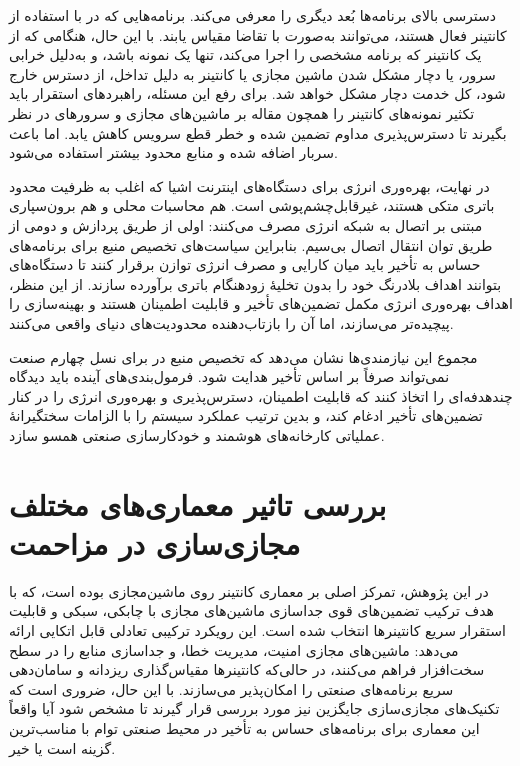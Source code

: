 دسترسی بالای برنامه‌ها بُعد دیگری را معرفی می‌کند. برنامه‌هایی که در  با استفاده از کانتینر فعال هستند، می‌توانند به‌صورت با تقاضا مقیاس یابند. با این حال، هنگامی که از یک کانتینر که برنامه مشخصی را اجرا می‌کند، تنها یک نمونه باشد، و به‌دلیل خرابی سرور، یا دچار مشکل شدن ماشین مجازی یا کانتینر به دلیل تداخل، از دسترس خارج شود، کل خدمت دچار مشکل خواهد شد. برای رفع این مسئله، راهبردهای استقرار باید تکثیر نمونه‌های کانتینر را همچون مقاله \cite{Zhang2020Neighbors} بر ماشین‌های مجازی و سرور‌های در نظر بگیرند تا دسترس‌پذیری مداوم تضمین شده و خطر قطع سرویس کاهش یابد. اما باعث سربار اضافه شده و منابع محدود  بیشتر استفاده می‌شود.

در نهایت، بهره‌وری انرژی برای دستگاه‌های اینترنت اشیا که اغلب به ظرفیت محدود باتری متکی هستند، غیرقابل‌چشم‌پوشی است. هم محاسبات محلی و هم برون‌سپاری مبتنی بر اتصال به شبکه انرژی مصرف می‌کنند\cite{Kaur2020KEIDS}: اولی از طریق پردازش و دومی از طریق توان انتقال اتصال بی‌سیم. بنابراین سیاست‌های تخصیص منبع برای برنامه‌های حساس به تأخیر باید میان کارایی و مصرف انرژی توازن برقرار کنند تا دستگاه‌های  بتوانند اهداف بلادرنگ خود را بدون تخلیهٔ زودهنگام باتری برآورده سازند. از این منظر، اهداف بهره‌وری انرژی مکمل تضمین‌های تأخیر و قابلیت اطمینان هستند و بهینه‌سازی را پیچیده‌تر می‌سازند، اما آن را بازتاب‌دهنده محدودیت‌های دنیای واقعی می‌کنند.

مجموع این نیازمندی‌ها نشان می‌دهد که تخصیص منبع در  برای نسل چهارم صنعت نمی‌تواند صرفاً بر اساس تأخیر هدایت شود. فرمول‌بندی‌های آینده باید دیدگاه چندهدفه‌ای را اتخاذ کنند که قابلیت اطمینان، دسترس‌پذیری و بهره‌وری انرژی را در کنار تضمین‌های تأخیر ادغام کند، و بدین ترتیب عملکرد سیستم را با الزامات سختگیرانهٔ عملیاتی کارخانه‌های هوشمند و خودکارسازی صنعتی همسو سازد.

\section{بررسی تاثیر معماری‌های مختلف مجازی‌سازی در مزاحمت}

در این پژوهش، تمرکز اصلی بر معماری کانتینر روی ماشین‌مجازی بوده است، که با هدف ترکیب تضمین‌های قوی جداسازی ماشین‌های مجازی با چابکی، سبکی و قابلیت استقرار سریع کانتینرها انتخاب شده است. این رویکرد ترکیبی تعادلی قابل اتکایی ارائه می‌دهد: ماشین‌های مجازی امنیت، مدیریت خطا، و جداسازی منابع را در سطح سخت‌افزار فراهم می‌کنند، در حالی‌که کانتینرها مقیاس‌گذاری ریزدانه و سامان‌دهی سریع برنامه‌های صنعتی را امکان‌پذیر می‌سازند. با این حال، ضروری است که تکنیک‌های مجازی‌سازی جایگزین نیز مورد بررسی قرار گیرند تا مشخص شود آیا واقعاً این معماری برای برنامه‌های حساس به تأخیر در محیط‌ صنعتی توام با  مناسب‌ترین گزینه است یا خیر.

